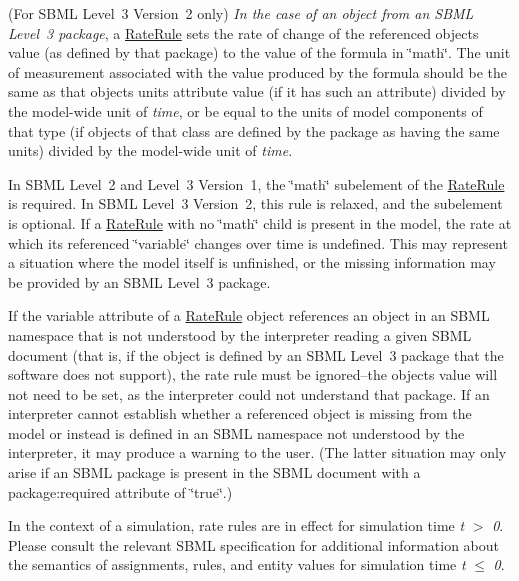 \begin{DoxyItemize}
\item (For S\+B\+ML Level~3 Version~2 only) {\itshape In the case of an object from an S\+B\+ML Level~3 package}, a \hyperlink{class_rate_rule}{Rate\+Rule} sets the rate of change of the referenced object\textquotesingle{}s value (as defined by that package) to the value of the formula in \char`\"{}math\char`\"{}. The unit of measurement associated with the value produced by the formula should be the same as that object\textquotesingle{}s units attribute value (if it has such an attribute) divided by the model-\/wide unit of {\itshape time}, or be equal to the units of model components of that type (if objects of that class are defined by the package as having the same units) divided by the model-\/wide unit of {\itshape time}. 
\end{DoxyItemize}

In S\+B\+ML Level~2 and Level~3 Version~1, the \char`\"{}math\char`\"{} subelement of the \hyperlink{class_rate_rule}{Rate\+Rule} is required. In S\+B\+ML Level~3 Version~2, this rule is relaxed, and the subelement is optional. If a \hyperlink{class_rate_rule}{Rate\+Rule} with no \char`\"{}math\char`\"{} child is present in the model, the rate at which its referenced \char`\"{}variable\char`\"{} changes over time is undefined. This may represent a situation where the model itself is unfinished, or the missing information may be provided by an S\+B\+ML Level~3 package.

If the variable attribute of a \hyperlink{class_rate_rule}{Rate\+Rule} object references an object in an S\+B\+ML namespace that is not understood by the interpreter reading a given S\+B\+ML document (that is, if the object is defined by an S\+B\+ML Level~3 package that the software does not support), the rate rule must be ignored--the object\textquotesingle{}s value will not need to be set, as the interpreter could not understand that package. If an interpreter cannot establish whether a referenced object is missing from the model or instead is defined in an S\+B\+ML namespace not understood by the interpreter, it may produce a warning to the user. (The latter situation may only arise if an S\+B\+ML package is present in the S\+B\+ML document with a package\+:required attribute of \char`\"{}true\char`\"{}.)

In the context of a simulation, rate rules are in effect for simulation time {\itshape t} $>$ {\itshape 0}. Please consult the relevant S\+B\+ML specification for additional information about the semantics of assignments, rules, and entity values for simulation time {\itshape t} $\leq$ {\itshape 0}.

